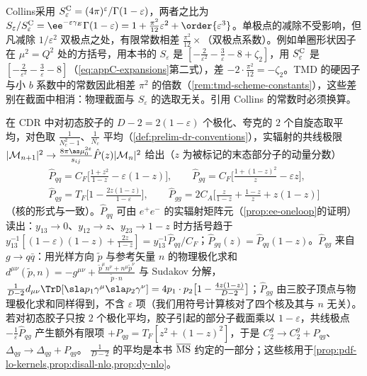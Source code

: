 \begin{remark}\label{rem:appC-Seps}
Collins\cite{Collins2011}采用 $S^{\rm C}_\varepsilon=(4\pi)^\varepsilon/\Gamma(1-\varepsilon)$，两者之比为 $S_\varepsilon/S^{\rm C}_\varepsilon=\ee^{-\varepsilon\gamma_E}\Gamma(1-\varepsilon)=1+\frac{\pi^2}{12}\varepsilon^2+\order{\varepsilon^3}$。单极点的减除不受影响，但凡减除 $1/\varepsilon^2$ 双极点之处，有限常数相差 $\frac{\pi^2}{12}\times$（双极点系数）。例如单圈形状因子在 $\mu^2=Q^2$ 处的方括号，用本书的 $S_\varepsilon$ 是 $[-\frac2{\varepsilon^2}-\frac3\varepsilon-8+\zeta_2]$，用 $S^{\rm C}_\varepsilon$ 是 $[-\frac2{\varepsilon^2}-\frac3\varepsilon-8]$（\cref{eq:appC-expansions}第二式），差 $-2\cdot\frac{\pi^2}{12}=-\zeta_2$。TMD 的硬因子与小 $b$ 系数中的常数因此相差 $\pi^2$ 的倍数（\cref{rem:tmd-scheme-constants}），这些差别在截面中相消：物理截面与 $S_\varepsilon$ 的选取无关。引用 Collins 的常数时必须换算。
\end{remark}

\begin{remark}[$D$ 维劈裂核与平均约定]\label{rem:appC-d-kernels}
在 CDR 中对初态胶子的 $D-2=2(1-\varepsilon)$ 个极化、夸克的 $2$ 个自旋态取平均，对色取 $\frac1{N_c^2-1}$、$\frac1{N_c}$ 平均（\cref{def:prelim-dr-conventions}），实辐射的共线极限 $|\mathcal M_{n+1}|^2\to\frac{8\pi\as\mu_0^{2\varepsilon}}{s_{ij}}\hat P(z)|\mathcal M_n|^2$ 给出（$z$ 为被标记的末态部分子的动量分数）
\begin{equation}\label{eq:appC-kernels}
\begin{gathered}
\hat P_{qq}=C_F\Big[\frac{1+z^2}{1-z}-\varepsilon(1-z)\Big],\qquad
\hat P_{gq}=C_F\Big[\frac{1+(1-z)^2}z-\varepsilon z\Big],\\
\hat P_{qg}=T_F\Big[1-\frac{2z(1-z)}{1-\varepsilon}\Big],\qquad
\hat P_{gg}=2C_A\Big[\frac z{1-z}+\frac{1-z}z+z(1-z)\Big]
\end{gathered}
\end{equation}
（核的形式与\cite{CataniSeymour1997}一致）。$\hat P_{qq}$ 可由 $e^+e^-$ 的实辐射矩阵元（\cref{prop:ee-oneloop}的证明）读出：$y_{13}\to0$、$y_{12}\to z$、$y_{23}\to1-z$ 时方括号趋于 $y_{13}^{-1}[(1-\varepsilon)(1-z)+\frac{2z}{1-z}]=y_{13}^{-1}\hat P_{qq}/C_F$；$\hat P_{gq}(z)=\hat P_{qq}(1-z)$。$\hat P_{qg}$ 来自 $g\to q\bar q$：用光样方向 $\tilde p$ 与参考矢量 $n$ 的物理极化求和 $d^{\mu\nu}(\tilde p,n)=-g^{\mu\nu}+\frac{\tilde p^\mu n^\nu+n^\mu\tilde p^\nu}{\tilde p\cdot n}$ 与 Sudakov 分解，$\frac1{D-2}d_{\mu\nu}\TrD[\sla p_1\gamma^\mu\sla p_2\gamma^\nu]=4p_1\cdot p_2\big[1-\frac{4z(1-z)}{D-2}\big]$；$\hat P_{gg}$ 由三胶子顶点与物理极化求和同样得到，不含 $\varepsilon$ 项（我们用符号计算核对了四个核及其与 $n$ 无关）。若对初态胶子只按 $2$ 个极化平均，胶子引起的部分子截面乘以 $1-\varepsilon$，共线极点 $-\frac1\varepsilon\hat P_{qg}$ 产生额外有限项 $+P_{qg}=T_F[z^2+(1-z)^2]$，于是 $C_2^g\to C_2^g+P_{qg}$、$\Delta_{qg}\to\Delta_{qg}+P_{qg}$。%
$\frac1{D-2}$ 的平均是本书 $\overline{\rm MS}$ 约定的一部分；这些核用于\cref{prop:pdf-lo-kernels,prop:disall-nlo,prop:dy-nlo}。
\end{remark}

